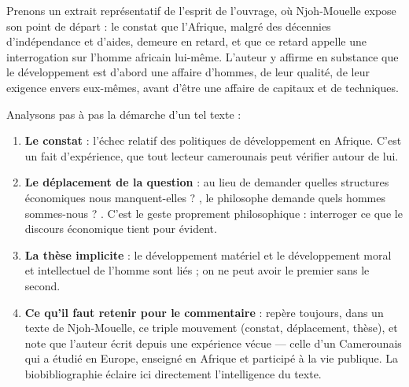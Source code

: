 \documentclass[11pt]{article}
\begin{document}
\begin{experience}
Prenons un extrait représentatif de l'esprit de l'ouvrage, où Njoh-Mouelle expose son point de départ : le constat que l'Afrique, malgré des décennies d'indépendance et d'aides, demeure en retard, et que ce retard appelle une interrogation sur l'homme africain lui-même. L'auteur y affirme en substance que le développement est d'abord une affaire d'hommes, de leur qualité, de leur exigence envers eux-mêmes, avant d'être une affaire de capitaux et de techniques.

Analysons pas à pas la démarche d'un tel texte :
\begin{enumerate}
\item \textbf{Le constat} : l'échec relatif des politiques de développement en Afrique. C'est un fait d'expérience, que tout lecteur camerounais peut vérifier autour de lui.
\item \textbf{Le déplacement de la question} : au lieu de demander \guillemotleft quelles structures économiques nous manquent-elles ? \guillemotright, le philosophe demande \guillemotleft quels hommes sommes-nous ? \guillemotright. C'est le geste proprement philosophique : interroger ce que le discours économique tient pour évident.
\item \textbf{La thèse implicite} : le développement matériel et le développement moral et intellectuel de l'homme sont liés ; on ne peut avoir le premier sans le second.
\item \textbf{Ce qu'il faut retenir pour le commentaire} : repère toujours, dans un texte de Njoh-Mouelle, ce triple mouvement (constat, déplacement, thèse), et note que l'auteur écrit depuis une expérience vécue — celle d'un Camerounais qui a étudié en Europe, enseigné en Afrique et participé à la vie publique. La biobibliographie éclaire ici directement l'intelligence du texte.
\end{enumerate}
\end{experience}
\end{document}
